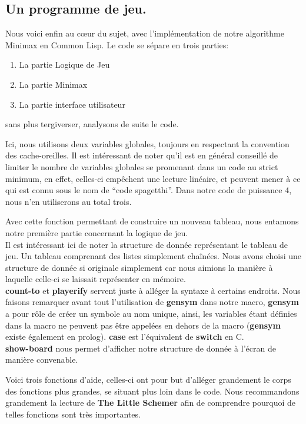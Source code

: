 \documentclass[a4paper, 12pt]{article}
\newcommand{\connect}[1]{
  
}
\numberwithin{equation}{subsection}
\begin{document}
\subsection{Un programme de jeu.}
Nous voici enfin au cœur du sujet, avec l'implémentation de notre algorithme Minimax en Common Lisp. Le code se sépare en trois parties:
\begin{enumerate}
  \item La partie Logique de Jeu
  \item La partie Minimax
  \item La partie interface utilisateur
\end{enumerate}
sans plus tergiverser, analysons de suite le code.
\connect{1-7}
Ici, nous utilisons deux variables globales, toujours en respectant la convention des cache-oreilles. Il est intéressant de noter qu'il est en général conseillé de limiter le nombre de variables globales se promenant dans un code au strict minimum, en effet, celles-ci empêchent une lecture linéaire, et peuvent mener à ce qui est connu sous le nom de ``code spagetthi''. Dans notre code de puissance 4, nous n'en utiliserons au total trois.
\connect{9-14}
Avec cette fonction permettant de construire un nouveau tableau, nous entamons notre première partie concernant la logique de jeu. \\

Il est intéressant ici de noter la structure de donnée représentant le tableau de jeu. Un tableau comprenant des listes simplement chaînées. Nous avons choisi une structure de donnée si originale simplement car nous aimions la manière à laquelle celle-ci se laissait représenter en mémoire. \\
\connect{16-39}
{\bf count-to} et {\bf playerify} servent juste à alléger la syntaxe à certains endroits.
Nous faisons remarquer avant tout l'utilisation de {\bf gensym} dans notre macro, {\bf gensym} a pour rôle de créer un symbole au nom unique, ainsi, les variables étant définies dans la macro ne peuvent pas être appelées en dehors de la macro ({\bf gensym} existe également en prolog). {\bf case} est l'équivalent de {\bf switch} en C. \\

{\bf show-board} nous permet d'afficher notre structure de donnée à l'écran de manière convenable.
\connect{41-53}
Voici trois fonctions d'aide, celles-ci ont pour but d'alléger grandement le corps des fonctions plus grandes, se situant plus loin dans le code. Nous recommandons grandement la lecture de {\bf The Little Schemer} afin de comprendre pourquoi de telles fonctions sont très importantes.
\end{document}
